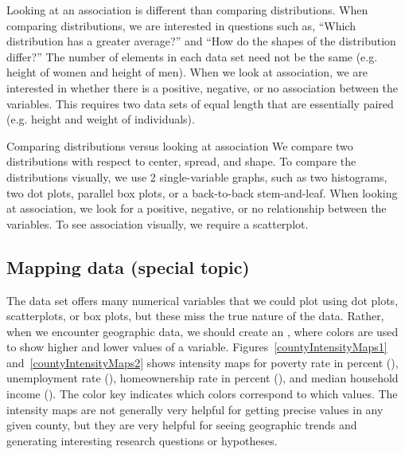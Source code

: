 Looking at an association is different than comparing distributions. When comparing distributions, we are interested in questions such as, ``Which distribution has a greater average?'' and ``How do the shapes of the distribution differ?'' The number of elements in each data set need not be the same (e.g. height of women and height of men). When we look at association, we are interested in whether there is a positive, negative, or no association between the variables. This requires two data sets of equal length that are essentially paired (e.g. height and weight of individuals).

\begin{onebox}{Comparing distributions versus looking at association}
We compare two distributions with respect to center, spread, and shape.  To compare the distributions visually, we use 2 single-variable graphs, such as two histograms, two dot plots, parallel box plots, or a back-to-back stem-and-leaf. When looking at association, we look for a positive, negative, or no relationship between the variables. To see association visually, we require a scatterplot.\end{onebox}




\subsection{Mapping data (special topic)}


The  data set offers many numerical variables
that we could plot using dot plots, scatterplots,
or box plots, but these miss the true nature of the data.
Rather, when we encounter geographic data, we should create
an , where colors are used
to show higher and lower values of a variable.
Figures~\ref{countyIntensityMaps1}
and~\ref{countyIntensityMaps2} shows intensity maps for
poverty rate in percent (),
unemployment rate (),
homeownership rate in percent (),
and median household income
().
The color key indicates which colors correspond to which values.
The intensity maps are not generally very helpful
for getting precise values in any given county,
but they are very helpful for seeing geographic trends
and generating interesting research questions or hypotheses.


